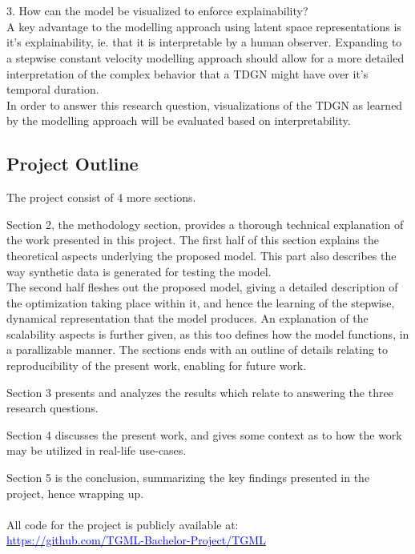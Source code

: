 \\\\
\hspace*{5mm} 3. How can the model be visualized to enforce explainability?
\\
A key advantage to the modelling approach using latent space representations is it's explainability, ie. that it is interpretable by a human observer.
Expanding to a stepwise constant velocity modelling approach should allow for a more detailed interpretation of the complex behavior that a TDGN might have over it's temporal duration.
\\
In order to answer this research question, visualizations of the TDGN as learned by the modelling approach will be evaluated based on interpretability. 



\subsection{Project Outline}
\label{sec:Intro:ThesisOutline}
The project consist of 4 more sections.

Section 2, the methodology section, provides a thorough technical explanation of the work presented in this project.
The first half of this section explains the theoretical aspects underlying the proposed model.
This part also describes the way synthetic data is generated for testing the model.
\\
The second half fleshes out the proposed model, giving a detailed description of the optimization taking place within it, and hence the learning of the stepwise, dynamical representation that the model produces.
An explanation of the scalability aspects is further given, as this too defines how the model functions, in a parallizable manner.
The sections ends with an outline of details relating to reproducibility of the present work, enabling for future work.

Section 3 presents and analyzes the results which relate to answering the three research questions.

Section 4 discusses the present work, and gives some context as to how the work may be utilized in real-life use-cases.

Section 5 is the conclusion, summarizing the key findings presented in the project, hence wrapping up.
\\\\
All code for the project is publicly available at:
\\
\href{https://github.com/TGML-Bachelor-Project/TGML}{\textcolor{blue}{https://github.com/TGML-Bachelor-Project/TGML}}





